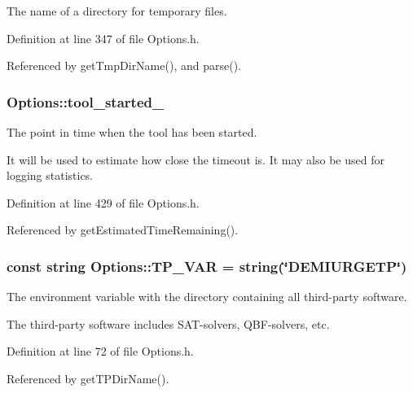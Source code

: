 The name of a directory for temporary files. 



Definition at line 347 of file Options.\-h.



Referenced by get\-Tmp\-Dir\-Name(), and parse().

\hypertarget{classOptions_a64ba8ff8e25368f44764cfe68fcb7610}{
\subsubsection[{tool\-\_\-started\-\_\-}]{ Options\-::tool\-\_\-started\-\_\-\hspace{0.3cm}{\ttfamily [protected]}}}\label{classOptions_a64ba8ff8e25368f44764cfe68fcb7610}


The point in time when the tool has been started. 

It will be used to estimate how close the timeout is. It may also be used for logging statistics. 

Definition at line 429 of file Options.\-h.



Referenced by get\-Estimated\-Time\-Remaining().

\hypertarget{classOptions_ad3285bfd4c5984cd79988ddce49ee507}{
\subsubsection[{T\-P\-\_\-\-V\-A\-R}]{\setlength{\rightskip}{0pt plus 5cm}const string Options\-::\-T\-P\-\_\-\-V\-A\-R = string(\char`\"{}D\-E\-M\-I\-U\-R\-G\-E\-T\-P\char`\"{})\hspace{0.3cm}{\ttfamily [static]}}}\label{classOptions_ad3285bfd4c5984cd79988ddce49ee507}


The environment variable with the directory containing all third-\/party software. 

The third-\/party software includes S\-A\-T-\/solvers, Q\-B\-F-\/solvers, etc. 

Definition at line 72 of file Options.\-h.



Referenced by get\-T\-P\-Dir\-Name().

